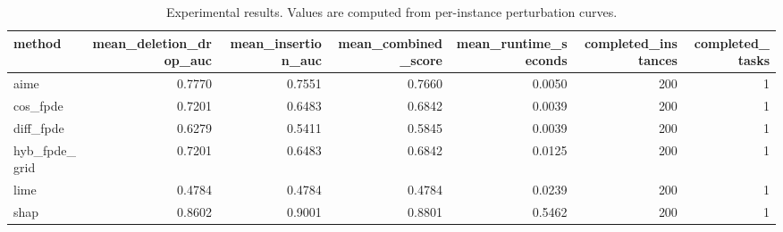 \begin{table}[t]
\caption{Experimental results. Values are computed from per-instance perturbation curves.}
\label{tab:main_results_computed}
\centering
\begin{tabular}{lrrrrrr}
\toprule
method & mean\_deletion\_drop\_auc & mean\_insertion\_auc & mean\_combined\_score & mean\_runtime\_seconds & completed\_instances & completed\_tasks \\
\midrule
aime & 0.7770 & 0.7551 & 0.7660 & 0.0050 & 200 & 1 \\
cos\_fpde & 0.7201 & 0.6483 & 0.6842 & 0.0039 & 200 & 1 \\
diff\_fpde & 0.6279 & 0.5411 & 0.5845 & 0.0039 & 200 & 1 \\
hyb\_fpde\_grid & 0.7201 & 0.6483 & 0.6842 & 0.0125 & 200 & 1 \\
lime & 0.4784 & 0.4784 & 0.4784 & 0.0239 & 200 & 1 \\
shap & 0.8602 & 0.9001 & 0.8801 & 0.5462 & 200 & 1 \\
\bottomrule
\end{tabular}

\end{table}
